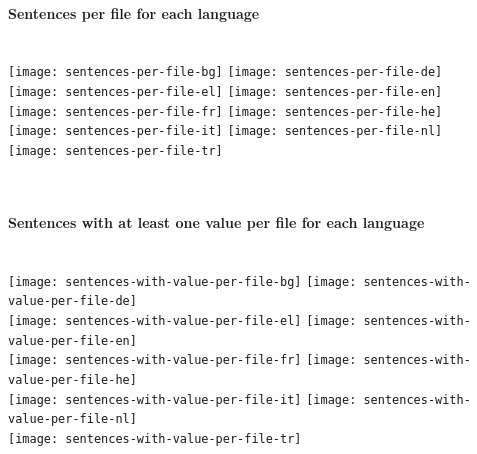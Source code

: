 \documentclass[a4paper]{article}
\newenvironment{figures}[1]{\noindent\begin{minipage}{\linewidth}\paragraph{#1}\noindent\\[\baselineskip]}{\end{minipage}\\[4ex]}
\begin{document}
\begin{figures}{Sentences per file for each language}
\texttt{[image: sentences-per-file-bg]}%
\hfill%
\texttt{[image: sentences-per-file-de]}\\[4ex]
\texttt{[image: sentences-per-file-el]}%
\hfill%
\texttt{[image: sentences-per-file-en]}\\[4ex]
\texttt{[image: sentences-per-file-fr]}%
\hfill%
\texttt{[image: sentences-per-file-he]}\\[4ex]
\texttt{[image: sentences-per-file-it]}%
\hfill%
\texttt{[image: sentences-per-file-nl]}\\[4ex]
\texttt{[image: sentences-per-file-tr]}
\end{figures}



\begin{figures}{Sentences with at least one value per file for each language}
\texttt{[image: sentences-with-value-per-file-bg]}%
\hfill%
\texttt{[image: sentences-with-value-per-file-de]}\\[4ex]
\texttt{[image: sentences-with-value-per-file-el]}%
\hfill%
\texttt{[image: sentences-with-value-per-file-en]}\\[4ex]
\texttt{[image: sentences-with-value-per-file-fr]}%
\hfill%
\texttt{[image: sentences-with-value-per-file-he]}\\[4ex]
\texttt{[image: sentences-with-value-per-file-it]}%
\hfill%
\texttt{[image: sentences-with-value-per-file-nl]}\\[4ex]
\texttt{[image: sentences-with-value-per-file-tr]}\\
\end{figures}
\end{document}
